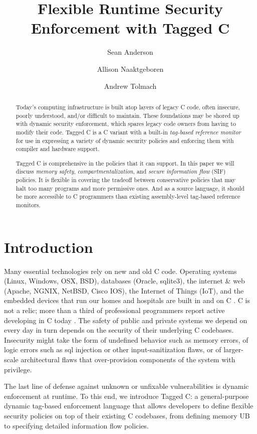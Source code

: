 \documentclass{llncs}
\title{Flexible Runtime Security Enforcement with Tagged C}
\author{Sean Anderson \and Allison Naaktgeboren \and Andrew Tolmach}
\institute{Portland State University}
\begin{document}





\begin{abstract}
Today's computing infrastructure is built atop layers of legacy C code, often
insecure, poorly understood, and/or difficult to maintain.
These foundations may be shored up with dynamic security enforcement,
which spares legacy code owners from having to modify their code.
Tagged C is a C variant with a built-in {\em tag-based reference monitor} for use in expressing
a variety of dynamic security policies and enforcing them with compiler and hardware support.

Tagged C is comprehensive in the policies that it can support. In this paper we will discuss
{\em memory safety}, {\em compartmentalization}, and {\em secure information flow} (SIF)
policies. It is flexible in covering the tradeoff between conservative policies that may
halt too many programs and more permissive ones. And as a source language, it should be
more accessible to C programmers than existing assembly-level tag-based reference monitors.

\end{abstract}

\maketitle

\section{Introduction}
Many essential technologies rely on new and old C code. 
Operating systems (Linux, Windows, OSX, BSD), databases (Oracle, sqlite3), the internet \&
web (Apache, NGNIX, NetBSD, Cisco IOS), the Internet of Things (IoT), and the 
embedded devices that run our homes and hospitals are built in and on C \cite{Munoz:PoweredbyC}. 
C is not a relic; more than a third of professional programmers report active developing
in C today \cite{stackoverflow22:dev-survey}. The safety of public and private systems we depend on every day
in turn depends on the security of their underlying C codebases. Insecurity might take the form
of undefined behavior such as memory errors, of logic errors such as sql injection or other
input-sanitization flaws, or of larger-scale architectural flaws that over-provision components of the
system with privilege.

The last line of defense against unknown or unfixable vulnerabilities is dynamic enforcement at
runtime. To this end, we introduce Tagged C: a general-purpose dynamic tag-based enforcement language
that allows developers to define flexible security policies on top of their existing C codebases,
from defining memory UB to specifying detailed information flow policies.
\end{document}
